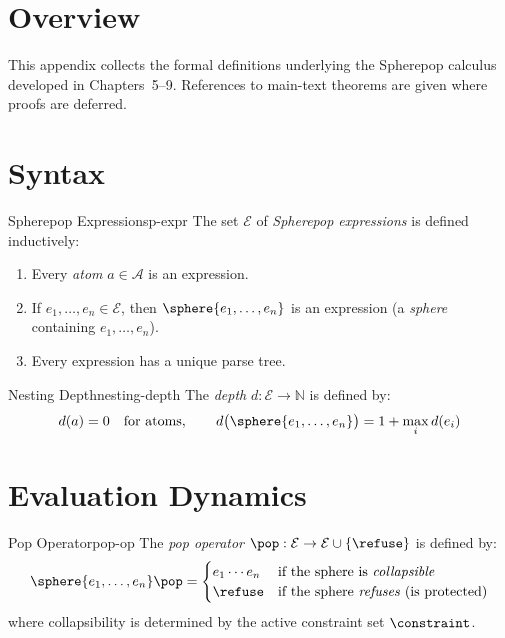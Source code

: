 
\section*{Overview}

This appendix collects the formal definitions underlying the Spherepop
calculus developed in Chapters~5–9. References to main-text theorems
are given where proofs are deferred.

\section{Syntax}

\begin{definition}{Spherepop Expression}{sp-expr}
  The set $\mathcal{E}$ of \emph{Spherepop expressions} is defined
  inductively:
  \begin{enumerate}
    \item Every \emph{atom} $a \in \mathcal{A}$ is an expression.
    \item If $e_1, \ldots, e_n \in \mathcal{E}$, then
          $\sphere{e_1, \ldots, e_n}$ is an expression
          (a \emph{sphere} containing $e_1, \ldots, e_n$).
    \item Every expression has a unique parse tree.
  \end{enumerate}
\end{definition}

\begin{definition}{Nesting Depth}{nesting-depth}
  The \emph{depth} $d : \mathcal{E} \to \mathbb{N}$ is defined by:
  \[
    d(a) = 0 \quad \text{for atoms},\qquad
    d\bigl(\sphere{e_1,\ldots,e_n}\bigr) = 1 + \max_i d(e_i)
  \]
\end{definition}

\section{Evaluation Dynamics}

\begin{definition}{Pop Operator}{pop-op}
  The \emph{pop operator} $\pop : \mathcal{E} \to \mathcal{E} \cup \{\refuse\}$
  is defined by:
  \[
    \sphere{e_1, \ldots, e_n} \pop = \begin{cases}
      e_1 \cdots e_n & \text{if the sphere is \emph{collapsible}} \\
      \refuse        & \text{if the sphere \emph{refuses} (is protected)} \\
    \end{cases}
  \]
  where collapsibility is determined by the active constraint set $\constraint$.
\end{definition}

